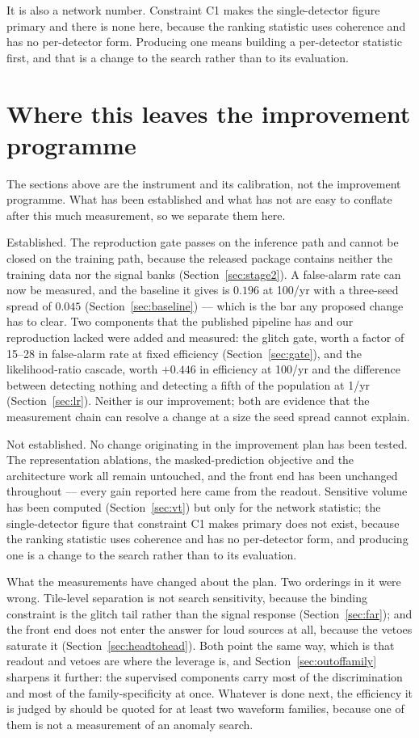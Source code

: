 \documentclass[11pt]{article}
\begin{document}
It is also a network number. Constraint C1 makes the single-detector figure primary and
there is none here, because the ranking statistic uses coherence and has no per-detector
form. Producing one means building a per-detector statistic first, and that is a change
to the search rather than to its evaluation.

\section{Where this leaves the improvement programme}

The sections above are the instrument and its calibration, not the improvement
programme. What has been established and what has not are easy to conflate after this
much measurement, so we separate them here.

Established. The reproduction gate passes on the inference path and cannot be closed on
the training path, because the released package contains neither the training data nor
the signal banks (Section~\ref{sec:stage2}). A false-alarm rate can now be measured, and
the baseline it gives is $0.196$ at 100/yr with a three-seed spread of $0.045$
(Section~\ref{sec:baseline}) --- which is the bar any proposed change has to clear.
Two components that the published pipeline has and our reproduction lacked were added
and measured: the glitch gate, worth a factor of 15--28 in false-alarm rate at fixed
efficiency (Section~\ref{sec:gate}), and the likelihood-ratio cascade, worth $+0.446$ in
efficiency at 100/yr and the difference between detecting nothing and detecting a fifth
of the population at 1/yr (Section~\ref{sec:lr}). Neither is our improvement; both are
evidence that the measurement chain can resolve a change at a size the seed spread
cannot explain.

Not established. No change originating in the improvement plan has been tested. The
representation ablations, the masked-prediction objective and the architecture work all
remain untouched, and the front end has been unchanged throughout --- every gain reported
here came from the readout. Sensitive volume has been computed
(Section~\ref{sec:vt}) but only for the network statistic; the single-detector figure
that constraint C1 makes primary does not exist, because the ranking statistic uses
coherence and has no per-detector form, and producing one is a change to the search
rather than to its evaluation.

What the measurements have changed about the plan. Two orderings in it were wrong.
Tile-level separation is not search sensitivity, because the binding constraint is the
glitch tail rather than the signal response (Section~\ref{sec:far}); and the front end
does not enter the answer for loud sources at all, because the vetoes saturate it
(Section~\ref{sec:headtohead}). Both point the same way, which is that readout and
vetoes are where the leverage is, and Section~\ref{sec:outoffamily} sharpens it further:
the supervised components carry most of the discrimination and most of the
family-specificity at once. Whatever is done next, the efficiency it is judged by should
be quoted for at least two waveform families, because one of them is not a measurement
of an anomaly search.
\end{document}
